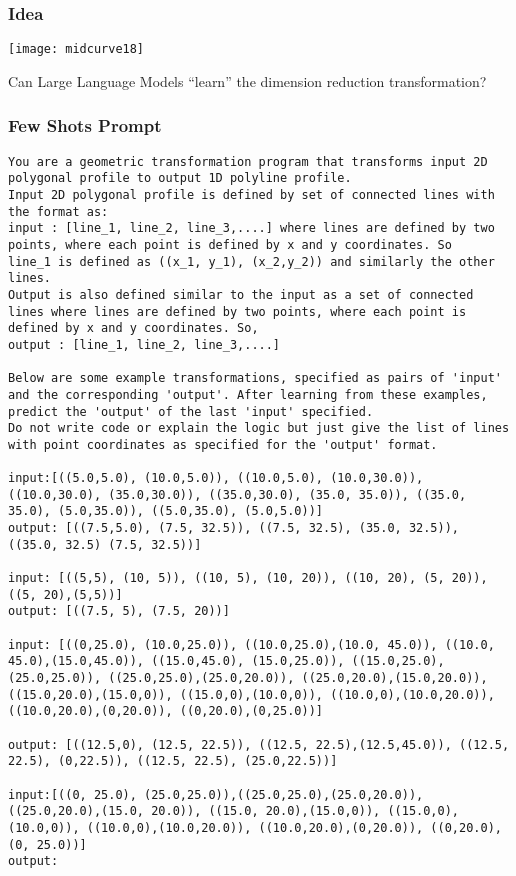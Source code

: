 \begin{frame}[fragile]\frametitle{Idea}
\begin{center}
\texttt{[image: midcurve18]}

Can Large Language Models ``learn'' the dimension reduction transformation?
\end{center}	
\end{frame}


\begin{frame}[fragile]\frametitle{Few Shots Prompt}
\begin{lstlisting}
You are a geometric transformation program that transforms input 2D polygonal profile to output 1D polyline profile. 
Input 2D polygonal profile is defined by set of connected lines with the format as:
input : [line_1, line_2, line_3,....] where lines are defined by two points, where each point is defined by x and y coordinates. So
line_1 is defined as ((x_1, y_1), (x_2,y_2)) and similarly the other lines.
Output is also defined similar to the input as a set of connected lines where lines are defined by two points, where each point is defined by x and y coordinates. So,
output : [line_1, line_2, line_3,....]

Below are some example transformations, specified as pairs of 'input' and the corresponding 'output'. After learning from these examples, predict the 'output' of the last 'input' specified.
Do not write code or explain the logic but just give the list of lines with point coordinates as specified for the 'output' format.

input:[((5.0,5.0), (10.0,5.0)), ((10.0,5.0), (10.0,30.0)), ((10.0,30.0), (35.0,30.0)), ((35.0,30.0), (35.0, 35.0)), ((35.0, 35.0), (5.0,35.0)), ((5.0,35.0), (5.0,5.0))]
output: [((7.5,5.0), (7.5, 32.5)), ((7.5, 32.5), (35.0, 32.5)), ((35.0, 32.5) (7.5, 32.5))]

input: [((5,5), (10, 5)), ((10, 5), (10, 20)), ((10, 20), (5, 20)), ((5, 20),(5,5))]
output: [((7.5, 5), (7.5, 20))]

input: [((0,25.0), (10.0,25.0)), ((10.0,25.0),(10.0, 45.0)), ((10.0, 45.0),(15.0,45.0)), ((15.0,45.0), (15.0,25.0)), ((15.0,25.0),(25.0,25.0)), ((25.0,25.0),(25.0,20.0)), ((25.0,20.0),(15.0,20.0)), ((15.0,20.0),(15.0,0)), ((15.0,0),(10.0,0)), ((10.0,0),(10.0,20.0)), ((10.0,20.0),(0,20.0)), ((0,20.0),(0,25.0))]

output: [((12.5,0), (12.5, 22.5)), ((12.5, 22.5),(12.5,45.0)), ((12.5, 22.5), (0,22.5)), ((12.5, 22.5), (25.0,22.5))]

input:[((0, 25.0), (25.0,25.0)),((25.0,25.0),(25.0,20.0)), ((25.0,20.0),(15.0, 20.0)), ((15.0, 20.0),(15.0,0)), ((15.0,0),(10.0,0)), ((10.0,0),(10.0,20.0)), ((10.0,20.0),(0,20.0)), ((0,20.0),(0, 25.0))]
output:
\end{lstlisting}	
\end{frame}

